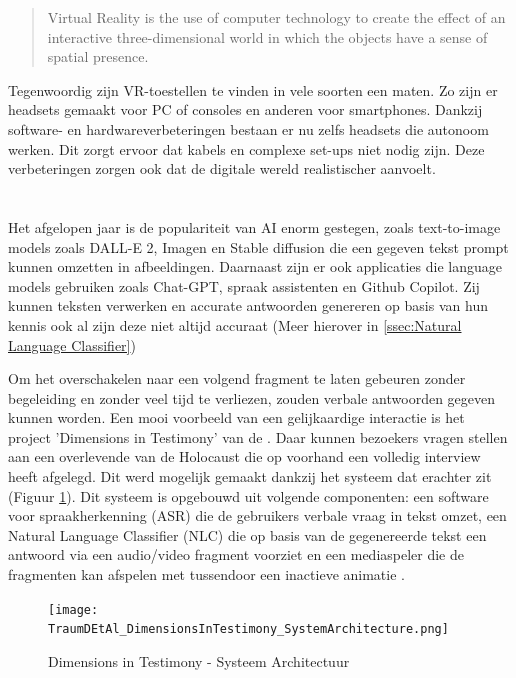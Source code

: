 \begin{quote}
    Virtual Reality is the use of computer technology to create the effect of an
    interactive three-dimensional world in which the objects have a sense of spatial
    presence. \autocite{Bryson2013}
\end{quote}

Tegenwoordig zijn VR-toestellen te vinden in vele soorten een maten. Zo zijn er headsets gemaakt voor PC of consoles en anderen voor smartphones. Dankzij software- en hardwareverbeteringen bestaan er nu zelfs headsets die autonoom werken. Dit zorgt ervoor dat kabels en complexe set-ups niet nodig zijn. Deze verbeteringen zorgen ook dat de digitale wereld realistischer aanvoelt.

\section{}%
Het afgelopen jaar is de populariteit van AI enorm gestegen, zoals text-to-image models zoals DALL-E 2, Imagen en Stable diffusion die een gegeven tekst prompt kunnen omzetten in afbeeldingen. Daarnaast zijn er ook applicaties die language models gebruiken zoals Chat-GPT, spraak assistenten en Github Copilot. Zij kunnen teksten verwerken en accurate antwoorden genereren op basis van hun kennis ook al zijn deze niet altijd accuraat (Meer hierover in \ref{ssec:Natural Language Classifier})

Om het overschakelen naar een volgend fragment te laten gebeuren zonder begeleiding en zonder veel tijd te verliezen, zouden verbale antwoorden gegeven kunnen worden. Een mooi voorbeeld van een gelijkaardige interactie is het project 'Dimensions in Testimony' van de \textcite{USCShoahFoundation2020}. Daar kunnen bezoekers vragen stellen aan een overlevende van de Holocaust die op voorhand een volledig interview heeft afgelegd. Dit werd mogelijk gemaakt dankzij het systeem dat erachter zit (Figuur \ref{fig:DiTArchitecture}). Dit systeem is opgebouwd uit volgende componenten: een software voor spraakherkenning (ASR) die de gebruikers verbale vraag in tekst omzet, een Natural Language Classifier (NLC) die op basis van de gegenereerde tekst een antwoord via een audio/video fragment voorziet en een mediaspeler die de fragmenten kan afspelen met tussendoor een inactieve animatie \autocite{Traum2015}.

\begin{figure}[h]
    \centering
    \texttt{[image: TraumDEtAl\_DimensionsInTestimony\_SystemArchitecture.png]}
    \caption{Dimensions in Testimony - Systeem Architectuur \autocite{Traum2015}}
    \label{fig:DiTArchitecture}
\end{figure}

